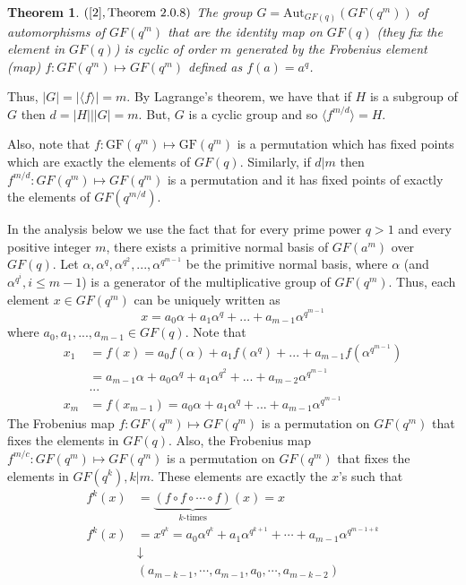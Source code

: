 \documentclass[11pt]{amsart}
\newcommand{\GF}{\mathrm{GF}}
\newtheorem{theorem}{{\bf Theorem }}
\begin{document}
\begin{theorem} $([2], \textnormal{Theorem }2.0.8)$
The group $\displaystyle G=\mbox{Aut}_{GF(q)}(GF(q^m))$ of automorphisms of $GF(q^m)$ that are the identity map on $GF(q)$ (they fix the element in $GF(q)$) is cyclic of order $m$ generated by the Frobenius element (map) $f: GF(q^m) \mapsto GF(q^m)$ defined as $f(a) = a^q$.
\end{theorem}
Thus, $\vert G\vert=|\langle f \rangle|= m$. By Lagrange's theorem, we have that if $H$ is a subgroup of $G$ then $d = |H| \Big| |G| = m$. But, $G$ is a cyclic group and so $\langle f^{m/d}\rangle = H$.

Also, note that $f: \GF(q^m) \mapsto \GF(q^m)$ is a permutation which has fixed points which are exactly the elements of $GF(q)$. Similarly, if $d|m$ then $ f^{m/d} : GF(q^m) \mapsto GF(q^m)$ is a permutation and it has fixed points of exactly the elements of $GF(q^{m/d})$. 

In the analysis below we use the fact that for every prime power $q > 1$ and every positive integer $m$, there exists a primitive normal basis of $GF(a^m)$ over $GF(q)$. Let $\alpha, \alpha^q, \alpha^{q^2}, ..., \alpha^{q^{m-1}}$ be the primitive normal basis, where $\alpha$ (and $\alpha ^{q^i}, i \leqslant m-1$) is a generator of the multiplicative group of $GF(q^m)$. Thus, each element $x\in GF(q^m)$ can be uniquely written as $$ x = a_0\alpha + a_1 \alpha ^q + ...+ a_{m-1}\alpha^{q^{m-1}}$$ where $a_0, a_1, ..., a_{m-1} \in GF(q)$. Note that
\begin{align*}
x_1 &= f(x) = a_0 f(\alpha) + a_1 f(\alpha^q) + ...+ a_{m-1}f(\alpha^{q^{m-1}})\\
&= a_{m-1}\alpha + a_0\alpha^q + a_1\alpha^{q^2}+...+a_{m-2}\alpha^{q^{m-1}}\\
&...\\
x_m &= f(x_{m-1}) = a_0\alpha + a_1 \alpha^q + ...+ a_{m-1}\alpha^{q^{m-1}}
\end{align*}
The Frobenius map $f: GF(q^m)\mapsto GF(q^m)$ is a permutation on $GF(q^m)$ that fixes the elements in $GF(q)$. Also, the  Frobenius map $f^{m/c}: GF(q^m) \mapsto GF(q^m)$ is a permutation on $GF(q^m)$ that fixes the elements in $GF(q^k), k|m$.  These elements are exactly the $x$'s such that 
\begin{align*}
 f^k(x) &= \underbrace{(f\circ f\circ \cdots \circ f)}_{k\mbox{-times}}(x) = x\\
 f^k(x)&= x^{q^k} = a_0 \alpha^{q^k} + a_1\alpha^{q^{k+1}}+\cdots + a_{m-1}\alpha^{q^{m-1+k}}\\
 &\downarrow\\
 &(a_{m-k-1},\cdots, a_{m-1}, a_{0},\cdots, a_{m-k-2})
 \end{align*}
 
\end{document}

